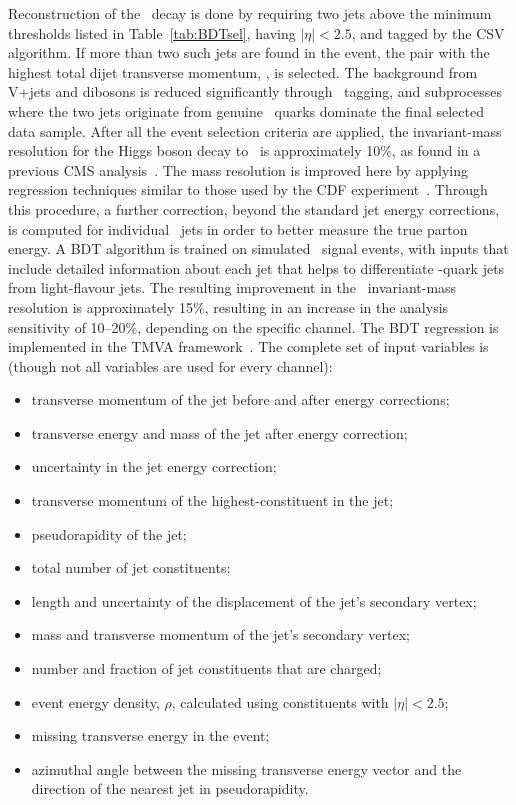 \documentclass[11pt,twoside,a4paper,cmspaper,final,collab]{cms-tdr}
\begin{document}
Reconstruction of the \HBB\ decay is done by requiring two
jets above the minimum \pt thresholds listed in Table~\ref{tab:BDTsel}, having $|\eta|<2.5$, and tagged by the
CSV algorithm.
If more than two such jets are
found in the event, the pair with the
highest total dijet transverse momentum, \ptjj, is selected. The background from V+jets and
dibosons is reduced significantly
through \cPqb\ tagging, and subprocesses where the two jets originate from
genuine \cPqb\ quarks dominate the final selected data sample. After all
the event selection criteria are applied, the invariant-mass
resolution for the Higgs boson decay to \cPqb\cPqb\ is
approximately 10\%, as found in a previous CMS analysis~\cite{VHbb_PLB}. The mass resolution
is improved here by applying regression techniques similar to those used by
the CDF experiment~\cite{1107.3026}. Through this procedure, a further correction, beyond the
standard jet energy corrections, is computed for
individual \cPqb\ jets in order to better measure the true parton
energy. A BDT algorithm is trained on
simulated  \HBB\ signal events, with
inputs that include detailed information about each jet
that helps to differentiate \cPqb-quark jets from light-flavour jets.
The resulting improvement in the \cPqb\cPqb\ invariant-mass resolution is approximately
15\%, resulting in an increase in the analysis sensitivity of
10--20\%, depending on the specific channel. The BDT regression is
implemented in the TMVA framework~\cite{Hocker:2007ht}.
The complete set of input variables is
(though not all variables are used for every channel):
\begin{itemize}
 \item transverse momentum of the jet before  and after energy corrections;
\item  transverse energy and mass of the jet after energy
  correction;
 \item  uncertainty in the jet energy correction;
 \item transverse momentum of the highest-\PT constituent in the jet;
\item pseudorapidity of the jet;
\item total number of jet constituents;
 \item length and uncertainty  of the displacement of the jet's secondary vertex;
\item mass and transverse momentum of the jet's secondary vertex;
\item number and fraction of jet constituents that are charged;
 \item event energy density, $\rho$, calculated using constituents with $\left | \eta \right | < 2.5$;
\item missing transverse energy in the event;
 \item  azimuthal angle between the missing transverse
   energy vector and the direction of the nearest jet in pseudorapidity.
\end{itemize}
\end{document}
